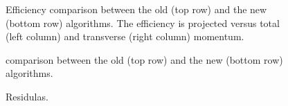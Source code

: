\begin{figure}[h]
  \centering
  \begin{subfigure}{0.5\textwidth}
    \scalebox{.6}{}
    \caption{}
    \label{mvTTm_eff_p}
  \end{subfigure}%
  \hfill%
  \begin{subfigure}{0.5\textwidth}
    \scalebox{.6}{}
    \caption{}
    \label{mvm_eff_p}
  \end{subfigure}
  \caption{Efficiency comparison between the old \mvm (top row) and the new \mvTTm (bottom row) algorithms.
 The efficiency is projected versus total (left column) and transverse (right column) momentum.  }
 \label{mvm_eff_p_comp}
\end{figure}

\begin{figure}[h]
  \centering
  \begin{subfigure}{0.5\textwidth}
    \scalebox{.6}{}
    \caption{}
    \label{mvTTm_chi2}
  \end{subfigure}%
  \hfill%
  \begin{subfigure}{0.5\textwidth}
    \scalebox{.6}{}
    \caption{}
    \label{mvm_chi2}
  \end{subfigure}
  \caption{\chisq comparison between the old \mvm (top row) and the new \mvTTm (bottom row) algorithms.}
 \label{mvm_chi2_comp}
\end{figure}

\begin{figure}[h]
  \centering
  \begin{subfigure}{0.5\textwidth}
    \scalebox{.6}{}
    \caption{}
    \label{mvTTm_res_x}
  \end{subfigure}%
  \hfill%
  \begin{subfigure}{0.5\textwidth}
    \scalebox{.6}{}
    \caption{}
    \label{mvm_res_y}
  \end{subfigure}
  \caption{Residulas.  }
 \label{mvm_res}
\end{figure}

